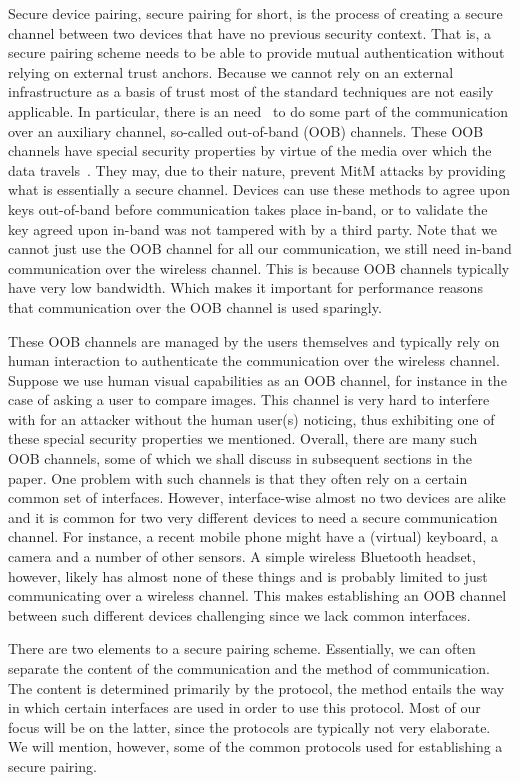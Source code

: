 \documentclass[conference, 11pt]{sty/IEEEtran}
\begin{document}
Secure device pairing, secure pairing for short, is the process of creating a secure channel between two devices that have no previous security context.
That is, a secure pairing scheme needs to be able to provide mutual authentication without relying on external trust anchors.
Because we cannot rely on an external infrastructure as a basis of trust most of the standard techniques are not easily applicable.
In particular, there is an need~\cite{kumar2009comparative} to do some part of the communication over an auxiliary channel, so-called out-of-band (OOB) channels.
These OOB channels have special security properties by virtue of the media over which the data travels~\cite{balfanz2002talking}.
They may, due to their nature, prevent MitM attacks by providing what is essentially a secure channel.
Devices can use these methods to agree upon keys out-of-band before communication takes place in-band, or to validate the key agreed upon in-band was not tampered with by a third party.
Note that we cannot just use the OOB channel for all our communication, we still need in-band communication over the wireless channel.
This is because OOB channels typically have very low bandwidth.
Which makes it important for performance reasons that communication over the OOB channel is used sparingly.

These OOB channels are managed by the users themselves and typically rely on human interaction to authenticate the communication over the wireless channel.
Suppose we use human visual capabilities as an OOB channel, for instance in the case of asking a user to compare images.
This channel is very hard to interfere with for an attacker without the human user(s) noticing, thus exhibiting one of these special security properties we mentioned.
Overall, there are many such OOB channels, some of which we shall discuss in subsequent sections in the paper.
One problem with such channels is that they often rely on a certain common set of interfaces.
However, interface-wise almost no two devices are alike and it is common for two very different devices to need a secure communication channel.
For instance, a recent mobile phone might have a (virtual) keyboard, a camera and a number of other sensors.
A simple wireless Bluetooth headset, however, likely has almost none of these things and is probably limited to just communicating over a wireless channel.
This makes establishing an OOB channel between such different devices challenging since we lack common interfaces.

There are two elements to a secure pairing scheme.
Essentially, we can often separate the content of the communication and the method of communication.
The content is determined primarily by the protocol, the method entails the way in which certain interfaces are used in order to use this protocol.
Most of our focus will be on the latter, since the protocols are typically not very elaborate.
We will mention, however, some of the common protocols used for establishing a secure pairing.
\end{document}
